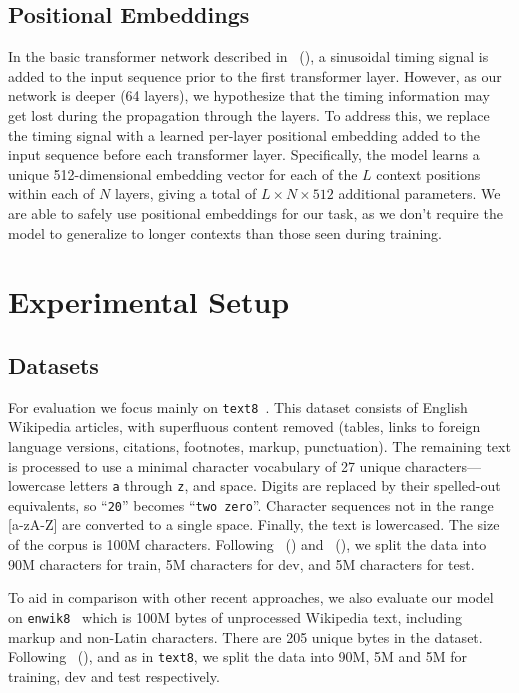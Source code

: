 \documentclass[letterpaper]{article}
\newcommand{\texteight}{\texttt{text8}}
\newcommand{\enwikeight}{\texttt{enwik8}}
\newcommand{\newcite}[1]{\citeauthor{#1}~(\citeyear{#1})}
\begin{document}
\subsection{Positional Embeddings}
\label{section:positional}
In the basic transformer network described in \newcite{NIPS2017_7181}, a sinusoidal timing signal is added to the input sequence prior to the first transformer layer.
However, as our network is deeper (64 layers), we hypothesize that the timing information may get lost during the propagation through the layers.
To address this, we replace the timing signal with a learned per-layer positional embedding added to the input sequence before each transformer layer.
Specifically, the model learns a unique 512-dimensional embedding vector for each of the $L$ context positions within each of $N$ layers, giving a total of $L \times N \times 512$ additional parameters.
We are able to safely use positional embeddings for our task, as we don't require the model to generalize to longer contexts than those seen during training.

\section{Experimental Setup}
\subsection{Datasets}


For evaluation we focus mainly on \texteight{}~\cite{mahoney}.
This dataset consists of English Wikipedia articles, with superfluous content removed (tables, links to foreign language versions, citations, footnotes, markup, punctuation).
The remaining text is processed to use a minimal character vocabulary of 27 unique characters---lowercase letters \texttt{a} through \texttt{z}, and space.
Digits are replaced by their spelled-out equivalents, so ``\texttt{20}'' becomes ``\texttt{two zero}''.
Character sequences not in the range [a-zA-Z] are converted to a single space.
Finally, the text is lowercased.
The size of the corpus is 100M characters.
Following \newcite{mikolov2012subword} and \newcite{zhang2016architectural}, we split the data into 90M characters for train, 5M characters for dev, and 5M characters for test.

To aid in comparison with other recent approaches, we also evaluate our model on \enwikeight{}~\cite{mahoney} which is 100M bytes of unprocessed Wikipedia text, including markup and non-Latin characters.
There are 205 unique bytes in the dataset.
Following \newcite{chung2015gated}, and as in \texteight{}, we split the data into 90M, 5M and 5M for training, dev and test respectively.
\end{document}
